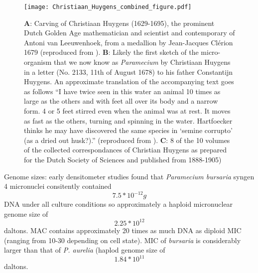 \begin{figure}[h!]
    \caption{\textbf{A}: Carving of Christiaan Huygens (1629-1695), the prominent Dutch Golden Age mathematician and scientist and contemporary of Antoni van Leeuwenhoek, from a medallion by Jean-Jacques Cl\'erion 1679 (reproduced from \citep{Huygens}). \textbf{B}: Likely the first sketch of the micro-organism that we now know as \textit{Paramecium} by Christiaan Huygens in a letter (No. 2133, 11th of August 1678) to his father Constantijn Huygens. An approximate translation of the accompanying text goes as follows ``I have twice seen in this water an animal 10 times as large as the others and with feet all over its body and a narrow form. 4 or 5 feet stirred even when the animal was at rest. It moves as fast as the others, turning and spinning in the water. Hartfoecker thinks he may have discovered the same species in `semine corrupto' (as a dried out husk?).'' (reproduced from \citep{Huygens}). \textbf{C}: 8 of the 10 volumes of the collected correspondances of Christian Huygens as prepared for the Dutch Society of Sciences and published from 1888-1905)}
\texttt{[image: Christiaan\_Huygens\_combined\_figure.pdf]}
\end{figure}











Genome sizes: early densitometer studies found that \textit{Paramecium bursaria} syngen 4 
micronuclei consitently contained \[ 7.5*10^{-12}g \] DNA under all culture conditions so 
approximately a haploid micronuclear genome size of \[ 2.25*10^{12}\] daltons.
MAC contains approximately 20 times as much DNA as diploid MIC (ranging from 10-30
depending on cell state).
MIC of \textit{bursaria} is considerably larger than that of \textit{P. aurelia}
(haplod genome size of \[ 1.84*10^{11} \] daltons.
\citep{Cullis1972}

